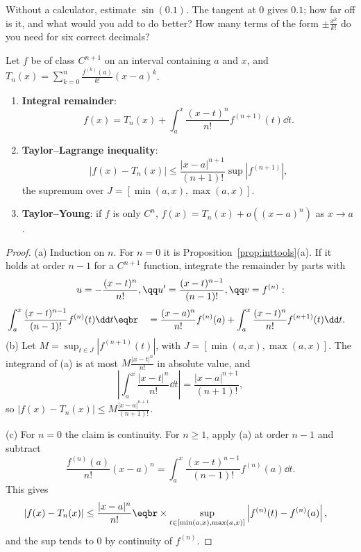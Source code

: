 \begin{think}
Without a calculator, estimate $\sin(0.1)$. The tangent at $0$ gives $0.1$; how far off is it, and what would you add to do better? How many terms of the form $\pm\frac{x^k}{k!}$ do you need for six correct decimals?
\end{think}

\begin{theorem}\label{thm:taylor}
Let $f$ be of class $C^{n+1}$ on an interval containing $a$ and $x$, and $T_n(x)=\sum_{k=0}^n\frac{f^{(k)}(a)}{k!}(x-a)^k$.
\begin{enumerate}[label=(\alph*)]
\item \textbf{Integral remainder}:
\[f(x)=T_n(x)+\int_a^x\frac{(x-t)^n}{n!}f^{(n+1)}(t)\dd t.\]
\item \textbf{Taylor--Lagrange inequality}:
\[|f(x)-T_n(x)|\le\frac{|x-a|^{n+1}}{(n+1)!}\sup|f^{(n+1)}|,\]
the supremum over $J=[\min(a,x),\max(a,x)]$.
\item \textbf{Taylor--Young}: if $f$ is only $C^n$, $f(x)=T_n(x)+o\left((x-a)^n\right)$ as $x\to a$.
\end{enumerate}
\end{theorem}
\begin{proof}
(a) Induction on $n$. For $n=0$ it is Proposition~\ref{prop:inttools}(a). If it holds at order $n-1$ for a $C^{n+1}$ function, integrate the remainder by parts with
\[
\begin{gathered}u=-\frac{(x-t)^n}{n!},\qq u'=\frac{(x-t)^{n-1}}{(n-1)!},\qq v=f^{(n)}:\end{gathered}
\]
\[
\begin{aligned}&\int_a^x\frac{(x-t)^{n-1}}{(n-1)!}f^{(n)}(t)\dd t\eqbr\quad=\frac{(x-a)^n}{n!}f^{(n)}(a)+\int_a^x\frac{(x-t)^n}{n!}f^{(n+1)}(t)\dd t.\end{aligned}
\]
(b) Let $M=\sup_{t\in J}|f^{(n+1)}(t)|$, with $J=[\min(a,x),\max(a,x)]$. The integrand of (a) is at most $M\frac{|x-t|^n}{n!}$ in absolute value, and
\[
\left|\int_a^x\frac{|x-t|^n}{n!}\dd t\right|=\frac{|x-a|^{n+1}}{(n+1)!},
\]
so $|f(x)-T_n(x)|\le M\frac{|x-a|^{n+1}}{(n+1)!}$.

(c) For $n=0$ the claim is continuity. For $n\ge1$, apply (a) at order $n-1$ and subtract
\[\frac{f^{(n)}(a)}{n!}(x-a)^n=\int_a^x\frac{(x-t)^{n-1}}{(n-1)!}f^{(n)}(a)\dd t.\]
This gives
\[\begin{aligned}|f(x)-T_n(x)|&\le\frac{|x-a|^n}{n!}\eqbr\times\sup_{t\in[\min(a,x),\max(a,x)]}\left|f^{(n)}(t)-f^{(n)}(a)\right|,\end{aligned}\]
and the sup tends to $0$ by continuity of $f^{(n)}$.
\end{proof}

